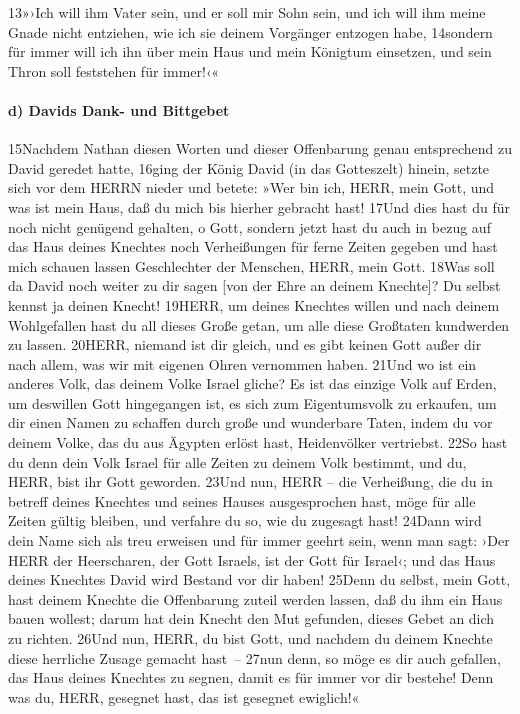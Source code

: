 13»›Ich will ihm Vater sein, und er soll mir Sohn sein, und ich will ihm
meine Gnade nicht entziehen, wie ich sie deinem Vorgänger entzogen habe,
14sondern für immer will ich ihn über mein Haus und mein Königtum
einsetzen, und sein Thron soll feststehen für immer!‹«

\hypertarget{d-davids-dank--und-bittgebet}{%
\paragraph{d) Davids Dank- und
Bittgebet}\label{d-davids-dank--und-bittgebet}}

15Nachdem Nathan diesen Worten und dieser Offenbarung genau entsprechend
zu David geredet hatte, 16ging der König David (in das Gotteszelt)
hinein, setzte sich vor dem HERRN nieder und betete: »Wer bin ich, HERR,
mein Gott, und was ist mein Haus, daß du mich bis hierher gebracht hast!
17Und dies hast du für noch nicht genügend gehalten, o Gott, sondern
jetzt hast du auch in bezug auf das Haus deines Knechtes noch
Verheißungen für ferne Zeiten gegeben und hast mich schauen lassen
Geschlechter der Menschen, HERR, mein Gott. 18Was soll da David noch
weiter zu dir sagen {[}von der Ehre an deinem Knechte{]}? Du selbst
kennst ja deinen Knecht! 19HERR, um deines Knechtes willen und nach
deinem Wohlgefallen hast du all dieses Große getan, um alle diese
Großtaten kundwerden zu lassen. 20HERR, niemand ist dir gleich, und es
gibt keinen Gott außer dir nach allem, was wir mit eigenen Ohren
vernommen haben. 21Und wo ist ein anderes Volk, das deinem Volke Israel
gliche? Es ist das einzige Volk auf Erden, um deswillen Gott hingegangen
ist, es sich zum Eigentumsvolk zu erkaufen, um dir einen Namen zu
schaffen durch große und wunderbare Taten, indem du vor deinem Volke,
das du aus Ägypten erlöst hast, Heidenvölker vertriebst. 22So hast du
denn dein Volk Israel für alle Zeiten zu deinem Volk bestimmt, und du,
HERR, bist ihr Gott geworden. 23Und nun, HERR -- die Verheißung, die du
in betreff deines Knechtes und seines Hauses ausgesprochen hast, möge
für alle Zeiten gültig bleiben, und verfahre du so, wie du zugesagt
hast! 24Dann wird dein Name sich als treu erweisen und für immer geehrt
sein, wenn man sagt: ›Der HERR der Heerscharen, der Gott Israels, ist
der Gott für Israel‹; und das Haus deines Knechtes David wird Bestand
vor dir haben! 25Denn du selbst, mein Gott, hast deinem Knechte die
Offenbarung zuteil werden lassen, daß du ihm ein Haus bauen wollest;
darum hat dein Knecht den Mut gefunden, dieses Gebet an dich zu richten.
26Und nun, HERR, du bist Gott, und nachdem du deinem Knechte diese
herrliche Zusage gemacht hast~-- 27nun denn, so möge es dir auch
gefallen, das Haus deines Knechtes zu segnen, damit es für immer vor dir
bestehe! Denn was du, HERR, gesegnet hast, das ist gesegnet ewiglich!«

